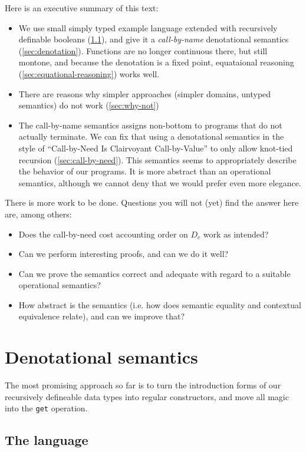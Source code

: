 \documentclass[manuscript,screen,acmsmall,nonacm]{acmart}
\begin{document}
Here is an executive summary of this text:
\begin{itemize}
\item We use small simply typed example language extended with recursively definable booleans (\cref{sec:language}), and give it a \emph{call-by-name} denotational semantics (\cref{sec:denotation}). Functions are no longer continuous there, but still montone, and because the denotation is a fixed point, equataional reasoning (\cref{sec:equational-reasoning}) works well.
\item There are reasons why simpler approaches (simpler domains, untyped semantics) do not work (\cref{sec:why-not})
\item The call-by-name semantics assigns non-bottom to programs that do not actually terminate. We can fix that using a denotational semantics in the style of  “Call-by-Need Is Clairvoyant Call-by-Value” to only allow knot-tied recursion (\cref{sec:call-by-need}).  This semantics seems to appropriately describe the behavior of our programs. It is more abstract than an operational semantics, although we cannot deny that we would prefer even more elegance.
\end{itemize}
There is more work to be done. Questions you will not (yet) find the answer here are, among others:
\begin{itemize}
\item Does the call-by-need cost accounting order on $D_c$ work as intended?
\item Can we perform interesting proofs, and can we do it well?
\item Can we prove the semantics correct and adequate with regard to a suitable operational semantics?\item How abstract is the semantics (i.e. how does semantic equality and contextual equivalence relate), and can we improve that?
\end{itemize}

\section{Denotational semantics}

The most promising approach so far is to turn the introduction forms of our recursively defineable data types into regular constructors, and move all magic into the \texttt{get} operation.

\subsection{The language}\label{sec:language}
\end{document}
